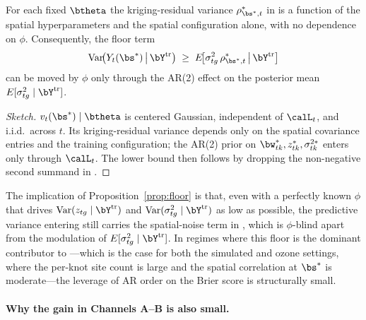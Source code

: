 \begin{proposition}\label{prop:floor}
For each fixed $\btheta$ the kriging-residual variance $\rho^*_{\bs^*, t}$ in  is a function of the spatial hyperparameters and the spatial configuration alone, with no dependence on $\phi$.  Consequently, the floor term
\begin{align}
  \mathrm{Var}\!\big(Y_t(\bs^*) \,\big|\, \bY^{\mathrm{tr}}\big)
    \;\ge\; E\!\big[\sigma^2_{tg}\,\rho^*_{\bs^*, t} \,\big|\, \bY^{\mathrm{tr}}\big]
  \label{eq:floor}
\end{align}
can be moved by $\phi$ only through the AR(2) effect on the posterior mean $E[\sigma^2_{tg} \mid \bY^{\mathrm{tr}}]$.
\end{proposition}

\begin{proof}[Sketch]
$v_t(\bs^*) \mid \btheta$ is centered Gaussian, independent of $\calL_t$, and i.i.d.\ across $t$.  Its kriging-residual variance  depends only on the spatial covariance entries and the training configuration; the AR(2) prior on $\bw^*_{tk}, z^*_{tk}, \sigma^{2*}_{tk}$ enters  only through $\calL_t$.  The lower bound  then follows by dropping the non-negative second summand in .
\end{proof}

The implication of Proposition~\ref{prop:floor} is that, even with a perfectly known $\phi$ that drives $\mathrm{Var}(z_{tg} \mid \bY^{\mathrm{tr}})$ and $\mathrm{Var}(\sigma^2_{tg} \mid \bY^{\mathrm{tr}})$ as low as possible, the predictive variance entering  still carries the spatial-noise term in , which is $\phi$-blind apart from the modulation of $E[\sigma^2_{tg} \mid \bY^{\mathrm{tr}}]$.  In regimes where this floor is the dominant contributor to ---which is the case for both the simulated and ozone settings, where the per-knot site count is large and the spatial correlation at $\bs^*$ is moderate---the leverage of AR order on the Brier score is structurally small.

\paragraph{Why the gain in Channels A--B is also small.}

